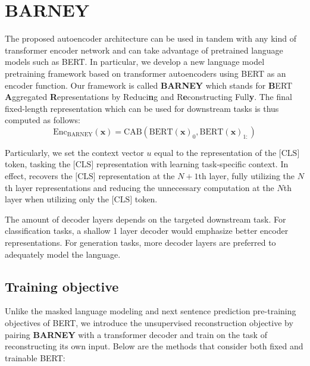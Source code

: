 
\section{BARNEY} %
The proposed autoencoder architecture can be used in tandem with any kind of transformer encoder network and can take advantage of pretrained language models such as BERT. In particular, we develop a new language model pretraining framework based on transformer autoencoders using BERT as an encoder function. Our framework is called \textbf{BARNEY} which stands for \textbf{B}ERT \textbf{A}ggregated \textbf{R}epresentations by Reduci\textbf{n}g and R\textbf{e}constructing Full\textbf{y}. The final fixed-length representation which can be used for downstream tasks is thus computed as follows:
$$\text{Enc}_\text{BARNEY}(\mathbf{x})=\text{CAB}(\text{BERT}(\mathbf{x})_0, \text{BERT}(\mathbf{x})_{1:})$$
 
Particularly, we set the context vector $u$ equal to the representation of the $\text{[CLS]}$ token, tasking the $\text{[CLS]}$ representation with learning task-specific context. In effect, recovers the $\text{[CLS]}$ representation at the $N+1$th layer, fully utilizing the $N$th layer representations and reducing the unnecessary computation at the $N$th layer when utilizing only the $\text{[CLS]}$ token.

The amount of decoder layers depends on the targeted downstream task. For classification tasks, a shallow 1 layer decoder would emphasize better encoder representations. For generation tasks, more decoder layers are preferred to adequately model the language.

\subsection{Training objective}
Unlike the masked language modeling and next sentence prediction pre-training objectives of BERT, we introduce the unsupervised reconstruction objective by pairing \textbf{BARNEY} with a transformer decoder and train on the task of reconstructing its own input. Below are the methods that consider both fixed and trainable BERT:

